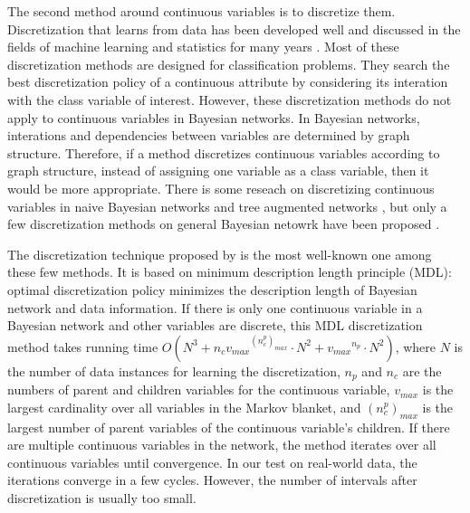 The second method around continuous variables is to discretize them. Discretization that learns from data has been developed well and discussed in the fields of machine learning and statistics for many years \citep{Dougherty_1995, Kerber_1992, Holte_1993, Fayyad_1993} . Most of these discretization methods are designed for classification problems. They search the best discretization policy of a continuous attribute by considering its interation with the class variable of interest. However, these discretization methods do not apply to continuous variables in Bayesian networks. In Bayesian networks, interations and dependencies between variables are determined by graph structure. Therefore, if a method discretizes continuous variables according to graph structure, instead of assigning one variable as a class variable, then it would be more appropriate. There is some reseach on discretizing continuous variables in naive Bayesian networks and tree augmented networks \citep{Fried_naive}, but only a few discretization methods on general Bayesian netowrk have been proposed \citep{Friedman_1996, Kozlov_1997, Monti_1998, Steck_2007}. 

The discretization technique proposed by \citet{Friedman_1996} is the most well-known one among these few methods. It is based on minimum description length principle (MDL): optimal discretization policy minimizes the description length of Bayesian network and data information. If there is only one continuous variable in a Bayesian network and other variables are discrete, this MDL discretization method takes running time $O(N^3 + n_c {v_{max}}^{(n_c^p)_{max}} \cdot N^2 + {v_{max}}^{n_p} \cdot N^2)$, where $N$ is the number of data instances for learning the discretization, $n_p$ and $n_c$ are the numbers of parent and children variables for the continuous variable, $v_{max}$ is the largest cardinality over all variables in the Markov blanket, and  ${(n_c^p)_{max}}$ is the largest number of parent variables of the continuous variable's children. If there are multiple continuous variables in the network, the method iterates over all continuous variables until convergence. In our test on real-world data, the iterations converge in a few cycles. However, the number of intervals after discretization is usually too small.

